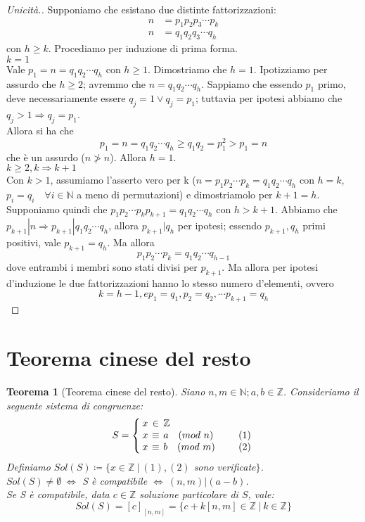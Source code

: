 \documentclass[12pt]{article}
\newcommand{\N}{\mathbb{N}}
\newcommand{\Z}{\mathbb{Z}}
\newcommand{\sesolose}{\Leftrightarrow}
\newcommand{\implica}{\Longrightarrow}
\renewcommand\qedsymbol{$\blacksquare$}
\newtheorem{theorem}{Teorema}
\begin{document}
\renewcommand\qedsymbol{$\blacksquare$}
\begin{proof}[Unicità.]
	Supponiamo che esistano due distinte fattorizzazioni:
	\begin{align*}
		n & = p_1 p_2 p_3 \cdots p_k \\
		n & = q_1 q_2 q_3 \cdots q_h
	\end{align*}
	con $h \ge k$. Procediamo per induzione di prima forma.
	\\[1\baselineskip]{\boldmath$k = 1$}
	\\Vale $p_1 = n = q_1 q_2 \cdots q_h$ con $h \ge 1$. Dimostriamo che $h = 1$. Ipotizziamo per assurdo che $ h \ge 2$; avremmo che $ n = q_1 q_2 \cdots q_h$. Sappiamo che essendo $p_1$ primo, deve necessariamente essere $ q_j = 1 \lor q_j = p_1$; tuttavia per ipotesi abbiamo che $q_j > 1 \implica q_j = p_1$.
	\\Allora si ha che
	$$ p_1 = n = q_1 q_2 \cdots q_h \ge q_1 q_2 = p^2_1 > p_1 = n $$
	che è un assurdo ($n \ngtr n$). Allora $h = 1$.
	\\[1\baselineskip]{\boldmath$k \ge 2, k \implica k+1$}
	\\Con $ k > 1 $, assumiamo l'asserto vero per k ($n = p_1 p_2 \cdots p_k = q_1 q_2 \cdots q_h$ con $h = k$, $p_i = q_i \quad\forall i \in \N$ a meno di permutazioni) e dimostriamolo per $k + 1 = h$. Supponiamo quindi che $p_1 p_2 \cdots p_k p_{k+1} = q_1 q_2 \cdots q_h$ con $h > k + 1$. Abbiamo che $p_{k+1} | n \implica p_{k+1} | q_1 q_2 \cdots q_h$, allora $p_{k+1} | q_h$ per ipotesi; essendo $p_{k+1}, q_h$ primi positivi, vale $p_{k+1} = q_h$. Ma allora
	$$p_1 p_2 \cdots p_k = q_1 q_2 \cdots q_{h-1} $$
	dove entrambi i membri sono stati divisi per $p_{k+1}$. Ma allora per ipotesi d'induzione le due fattorizzazioni hanno lo stesso numero d'elementi, ovvero
	$$k = h - 1, e p_1 = q_1, p_2 = q_2, \cdots p_{k+1} = q_h$$
\end{proof}

\section{Teorema cinese del resto}
\begin{theorem}[Teorema cinese del resto]
	Siano $n, m \in \N; a, b \in \Z$. Consideriamo il seguente sistema di congruenze:
	\[
	S = \left\{
	\setlength\arraycolsep{2pt}
	\begin{array}{rclc} x & \in & \Z & \\ x & \equiv &a\quad (mod\ n) &\qquad (1) \\ x & \equiv& b\quad (mod \ m)& \qquad (2)
	\end{array}\right
	.
	\]
	Definiamo $Sol(S) \coloneqq \{ x \in \Z \ |\ (1), (2)$ sono verificate$\}$.
	\\ $Sol(S) \ne \emptyset \ \sesolose$ S è compatibile $ \sesolose \ (n,m) | (a-b)$.
	\\ Se S è compatibile, data $c \in \Z$ soluzione particolare di $S$, vale:
	$$Sol(S) = [c]_{[n,m]} = \{ c + k[n,m] \in \Z \ |\ k \in \Z\}$$
\end{theorem}
\end{document}
